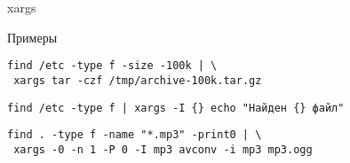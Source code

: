 \begin{frame}[fragile]{xargs}
	\begin{block}{Примеры}
		\begin{verbatim}
find /etc -type f -size -100k | \
 xargs tar -czf /tmp/archive-100k.tar.gz
		\end{verbatim}

		\begin{verbatim}
find /etc -type f | xargs -I {} echo "Найден {} файл"
		\end{verbatim}

		\begin{verbatim}
find . -type f -name "*.mp3" -print0 | \
 xargs -0 -n 1 -P 0 -I mp3 avconv -i mp3 mp3.ogg
		\end{verbatim}
	
	\end{block}
\end{frame}


